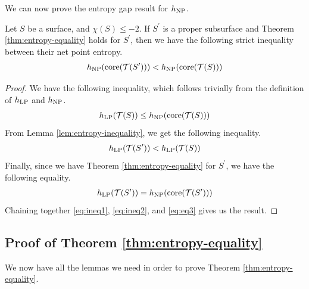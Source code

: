 \documentclass[12pt, reqno]{amsart}
\begin{document}
We can now prove the entropy gap result for $h_{\mathrm{NP}}$.

\begin{lemma}
  \label{lem:net-point-entropy-inequality}
  Let $S$ be a surface, and $\chi(S) \leq -2$. If $S^{\prime}$ is a proper subsurface and Theorem \ref{thm:entropy-equality} holds for $S^{\prime}$, then we have the following strict inequality between their net point entropy.
  \begin{align*}
    h_{\mathrm{NP}}(\mathrm{core}(\mathcal{T}(S^{\prime}))) < h_{\mathrm{NP}}(\mathrm{core}(\mathcal{T}(S)))
  \end{align*}
\end{lemma}

\begin{proof}
  We have the following inequality, which follows trivially from the definition of $h_{\mathrm{LP}}$ and $h_{\mathrm{NP}}$.
  \begin{align}
    \label{eq:ineq1}
    h_{\mathrm{LP}}(\mathcal{T}(S)) \leq h_{\mathrm{NP}}(\mathrm{core}(\mathcal{T}(S)))
  \end{align}
  From Lemma \ref{lem:entropy-inequality}, we get the following inequality.
  \begin{align}
    \label{eq:ineq2}
    h_{\mathrm{LP}}(\mathcal{T}(S^{\prime})) < h_{\mathrm{LP}}(\mathcal{T}(S))
  \end{align}
  Finally, since we have Theorem \ref{thm:entropy-equality} for $S^{\prime}$, we have the following equality.
  \begin{align}
    \label{eq:eq3}
    h_{\mathrm{LP}}(\mathcal{T}(S^{\prime})) = h_{\mathrm{NP}}(\mathrm{core}(\mathcal{T}(S^{\prime})))
  \end{align}
  Chaining together \eqref{eq:ineq1}, \eqref{eq:ineq2}, and \eqref{eq:eq3} gives us the result.
\end{proof}

\subsection{Proof of Theorem \ref{thm:entropy-equality}}
\label{sec:proof-theorem}

We now have all the lemmas we need in order to prove Theorem \ref{thm:entropy-equality}.
\end{document}
